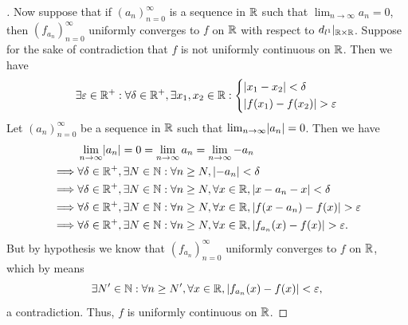 \begin{proof}[]
  Now suppose that if \((a_n)_{n = 0}^\infty\) is a sequence in \(\mathbb{R}\) such that \(\lim_{n \to \infty} a_n = 0\), then \((f_{a_n})_{n = 0}^\infty\) uniformly converges to \(f\) on \(\mathbb{R}\) with respect to \(d_{l^1}|_{\mathbb{R} \times \mathbb{R}}\).
  Suppose for the sake of contradiction that \(f\) is not uniformly continuous on \(\mathbb{R}\).
  Then we have
  \[
    \exists \varepsilon \in \mathbb{R}^+ : \forall \delta \in \mathbb{R}^+, \exists x_1, x_2 \in \mathbb{R} : \begin{dcases}
      \left\lvert x_1 - x_2\right\rvert < \delta \\
      \left\lvert f(x_1) - f(x_2)\right\rvert > \varepsilon
    \end{dcases}
  \]
  Let \((a_n)_{n = 0}^\infty\) be a sequence in \(\mathbb{R}\) such that \(\lim_{n \to \infty} \abs{a_n} = 0\).
  Then we have
  \begin{align*}
             & \lim_{n \to \infty} \abs{a_n} = 0 = \lim_{n \to \infty} a_n = \lim_{n \to \infty} -a_n                                 \\
    \implies & \forall \delta \in \R^+, \exists N \in \N : \forall n \geq N, \abs{-a_n} < \delta                                      \\
    \implies & \forall \delta \in \R^+, \exists N \in \N : \forall n \geq N, \forall x \in \R, \abs{x - a_n - x} < \delta             \\
    \implies & \forall \delta \in \R^+, \exists N \in \N : \forall n \geq N, \forall x \in \R, \abs{f(x - a_n) - f(x)} > \varepsilon  \\
    \implies & \forall \delta \in \R^+, \exists N \in \N : \forall n \geq N, \forall x \in \R, \abs{f_{a_n}(x) - f(x)} > \varepsilon.
  \end{align*}
  But by hypothesis we know that \((f_{a_n})_{n = 0}^\infty\) uniformly converges to \(f\) on \(\mathbb{R}\), which by  means
  \[
    \exists N' \in \mathbb{N} : \forall n \geq N', \forall x \in \mathbb{R}, \left\lvert f_{a_n}(x) - f(x)\right\rvert < \varepsilon,
  \]
  a contradiction.
  Thus, \(f\) is uniformly continuous on \(\mathbb{R}\).
\end{proof}

